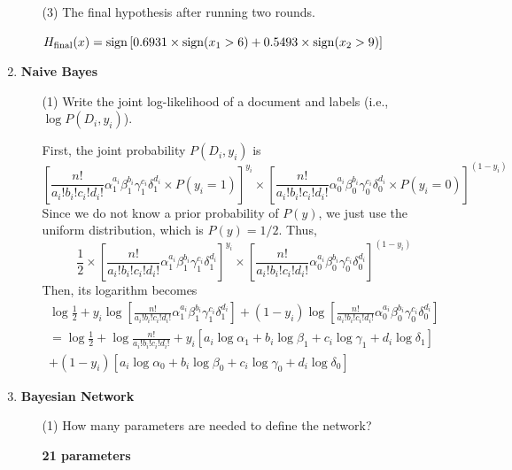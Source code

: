 \begin{enumerate}
\begin{enumerate}
\item[(3)] The final hypothesis after running two rounds.

$H_{\rm final}(x)={\rm sign} \left[ 0.6931 \times {\rm sign}(x_1 > 6) + 0.5493 \times {\rm sign}(x_2 > 9) \right]$

\end{enumerate}

\item {\bf Naive Bayes}

\begin{enumerate}
\item[(1)] Write the joint log-likelihood of a document and labels (i.e., $\log P(D_i, y_i)$).

First, the joint probability $P(D_i, y_i)$ is
\[
\left[ \frac{n!}{a_i!b_i!c_i!d_i!}\alpha_1^{a_i}\beta_1^{b_i}\gamma_1^{c_i}\delta_1^{d_i} \times P(y_i=1)\right]^{y_i} \times \left[ \frac{n!}{a_i!b_i!c_i!d_i!}\alpha_0^{a_i}\beta_0^{b_i}\gamma_0^{c_i}\delta_0^{d_i} \times P(y_i=0)\right]^{(1-y_i)}
\]
Since we do not know a prior probability of $P(y)$, we just use the uniform distribution, which is $P(y)=1/2$. Thus,
\[
\frac{1}{2} \times \left[ \frac{n!}{a_i!b_i!c_i!d_i!}\alpha_1^{a_i}\beta_1^{b_i}\gamma_1^{c_i}\delta_1^{d_i}\right]^{y_i} \times \left[ \frac{n!}{a_i!b_i!c_i!d_i!}\alpha_0^{a_i}\beta_0^{b_i}\gamma_0^{c_i}\delta_0^{d_i}\right]^{(1-y_i)}
\]
Then, its logarithm becomes
\begin{eqnarray}
\log \frac{1}{2} + y_i \log \left[ \frac{n!}{a_i!b_i!c_i!d_i!}\alpha_1^{a_i}\beta_1^{b_i}\gamma_1^{c_i}\delta_1^{d_i}\right] + (1-y_i) \log \left[ \frac{n!}{a_i!b_i!c_i!d_i!}\alpha_0^{a_i}\beta_0^{b_i}\gamma_0^{c_i}\delta_0^{d_i}\right]
 \nonumber \\
= \log \frac{1}{2} + \log \frac{n!}{a_i!b_i!c_i!d_i!} + y_i \left[ a_i \log \alpha_1 + b_i \log \beta_1 + c_i \log \gamma_1 + d_i \log \delta_1 \right] \nonumber \\ + (1-y_i) \left[ a_i \log \alpha_0 + b_i \log \beta_0 + c_i \log \gamma_0 + d_i \log \delta_0 \right] \nonumber
\end{eqnarray}

\end{enumerate}

\item {\bf Bayesian Network}
\begin{enumerate}

\item[(1)] How many parameters are needed to define the network?

{\bf 21 parameters}


\end{enumerate}
\end{enumerate}
